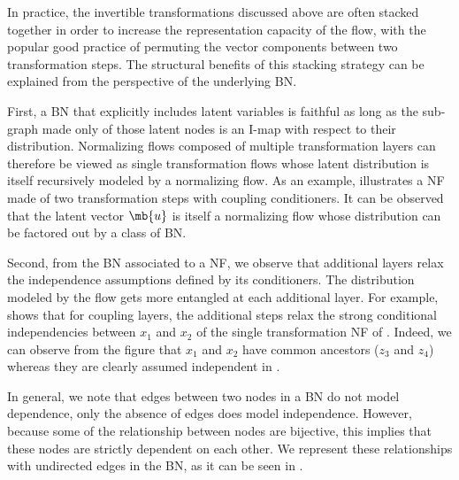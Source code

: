 In practice, the invertible transformations discussed above are often stacked together in order to increase the representation capacity of the flow, with the popular good practice of permuting the vector components between two transformation steps.
The structural benefits of this stacking strategy can be explained from the perspective of the underlying BN.

First, a BN that explicitly includes latent variables is faithful as long as the sub-graph made only of those latent nodes is an I-map with respect to their distribution.
Normalizing flows composed of multiple transformation layers can therefore be viewed as single transformation flows whose latent distribution is itself recursively modeled by a normalizing flow.
As an example,  illustrates a NF made of two transformation steps with coupling conditioners. It can be observed that the latent vector $\mb{u}$ is itself a normalizing flow  whose distribution can be factored out by a class of BN.

Second, from the BN associated to a NF, we observe that additional layers relax the independence assumptions defined by its conditioners.
The distribution modeled by the flow gets more entangled at each additional layer.
For example,  shows that for coupling layers, the additional steps relax the strong conditional independencies between $x_1$ and $x_2$ of the single transformation NF of .
Indeed, we can observe from the figure that $x_1$ and $x_2$ have common ancestors ($z_3$ and $z_4$) whereas they are clearly assumed independent in .

In general, we note that edges between two nodes in a BN do not model dependence, only the absence of edges does model independence. However, because some of the relationship between nodes are bijective, this implies that these nodes are strictly dependent on each other. We represent these relationships with undirected edges in the BN, as it can be seen in .



